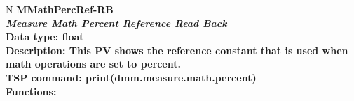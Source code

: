 \documentclass[openany]{article}
\begin{document}
		\begin{tabular}{N}
			\hline
			\bfseries MMathPercRef-RB\label{pv:mmathpercref-rb} \\ \hline
			\emph{Measure Math Percent Reference Read Back} \\
			Data type: float \\
			Description: This PV shows the reference constant that is used when math operations are set to percent. \\
			TSP command: print(dmm.measure.math.percent) \\
			Functions: \\
			\arrayrulecolor{\FuncTableBorderColor}

		\end{tabular}
\end{document}
